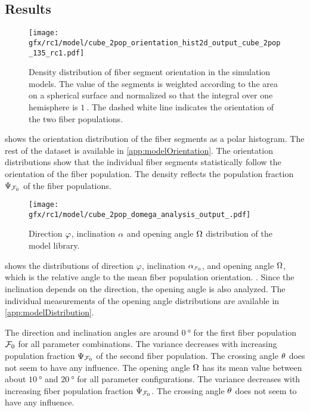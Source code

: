 \subsection{Results}
%
\begin{figure}[!t]
\centering
\texttt{[image: gfx/rc1/model/cube\_2pop\_orientation\_hist2d\_output\_cube\_2pop\_135\_rc1.pdf]}
\caption{Density distribution of fiber segment orientation in the simulation models.
The value of the segments is weighted according to the area on a spherical surface and normalized so that the integral over one hemisphere is $\SI{1}{}$.
The dashed white line indicates the orientation of the two fiber populations.}
\label{fig:modelOrientation}
\end{figure}
%
 shows the orientation distribution of the fiber segments as a polar histogram.
The rest of the dataset is available in \cref{app:modelOrientation}.
The orientation distributions show that the individual fiber segments statistically follow the orientation of the fiber population.
The density reflects the population fraction $\textnormal{$\Psi_{\textnormal{$\mathcal{F}_0$}}$}$ of the fiber populations.
\par
% 
\begin{figure}[!t]
    \centering
    \texttt{[image: gfx/rc1/model/cube\_2pop\_domega\_analysis\_output\_.pdf]}
    \caption{Direction $\textnormal{$\varphi$}$, inclination $\textnormal{$\alpha$}$ and opening angle $\textnormal{$\Omega$}$ distribution of the model library.}
    \label{fig:modelAngleBoxPlot}
\end{figure}
%
 shows the distributions of direction $\varphi$, inclination $\modelInc$, and opening angle $\textnormal{$\Omega$}$, which is the relative angle to the mean fiber population orientation.
\dummy{}.
Since the inclination depends on the direction, the opening angle is also analyzed.
The individual measurements of the opening angle distributions are available in \cref{app:modelDistribution}.
\par
% 
The direction and inclination angles are around $\SI{0}{\degree}$ for the first fiber population $\textnormal{$\mathcal{F}_0$}$ for all parameter combinations.
The variance decreases with increasing population fraction $\textnormal{$\Psi_{\textnormal{$\mathcal{F}_0$}}$}$ of the second fiber population.
The crossing angle $\textnormal{$\theta$}$ does not seem to have any influence.
The opening angle $\textnormal{$\Omega$}$ has its mean value between about $\SI{10}{\degree}$ and $\SI{20}{\degree}$ for all parameter configurations.
The variance decreases with increasing fiber population fraction $\textnormal{$\Psi_{\textnormal{$\mathcal{F}_0$}}$}$.
The crossing angle $\textnormal{$\theta$}$ does not seem to have any influence.
